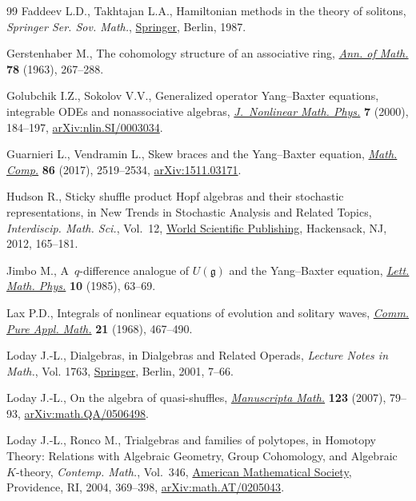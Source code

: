 \documentclass[pdftex]{sigma}
\numberwithin{equation}{section}
\newcounter{diff_order}
\newcounter{diff_power}
\theoremstyle{definition}
\begin{document}
\begin{thebibliography}{99}
Faddeev L.D., Takhtajan L.A., Hamiltonian methods in the theory of solitons,
 \textit{Springer Ser. Sov. Math.},
 \href{https://doi.org/10.1007/978-3-540-69969-9}{Springer}, Berlin, 1987.

Gerstenhaber M., The cohomology structure of an associative ring,
 \href{https://doi.org/10.2307/1970343}{\textit{Ann. of Math.}} \textbf{78}
 (1963), 267--288.

Golubchik I.Z., Sokolov V.V., Generalized operator {Y}ang--{B}axter equations,
 integrable {ODE}s and nonassociative algebras,
 \href{https://doi.org/10.2991/jnmp.2000.7.2.8}{\textit{J.~Nonlinear Math.
 Phys.}} \textbf{7} (2000), 184--197,
 \href{http://arxiv.org/abs/nlin.SI/0003034}{arXiv:nlin.SI/0003034}.

Guarnieri L., Vendramin L., Skew braces and the {Y}ang--{B}axter equation,
 \href{https://doi.org/10.1090/mcom/3161}{\textit{Math. Comp.}} \textbf{86}
 (2017), 2519--2534, \href{http://arxiv.org/abs/1511.03171}{arXiv:1511.03171}.

Hudson R., Sticky shuffle product {H}opf algebras and their stochastic
 representations, in New Trends in Stochastic Analysis and Related Topics,
 \textit{Interdiscip. Math. Sci.}, Vol.~12,
 \href{https://doi.org/10.1142/9789814360920_0006}{World Scientific
 Publishing}, Hackensack, NJ, 2012, 165--181.

Jimbo M., A~{$q$}-difference analogue of {$U({\mathfrak g})$} and the
 {Y}ang--{B}axter equation,
 \href{https://doi.org/10.1007/BF00704588}{\textit{Lett. Math. Phys.}}
 \textbf{10} (1985), 63--69.

Lax P.D., Integrals of nonlinear equations of evolution and solitary waves,
 \href{https://doi.org/10.1002/cpa.3160210503}{\textit{Comm. Pure Appl.
 Math.}} \textbf{21} (1968), 467--490.

Loday J.-L., Dialgebras, in Dialgebras and Related Operads, \textit{Lecture
 Notes in Math.}, Vol. 1763,
 \href{https://doi.org/10.1007/3-540-45328-8_2}{Springer}, Berlin, 2001,
 7--66.

Loday J.-L., On the algebra of quasi-shuffles,
 \href{https://doi.org/10.1007/s00229-007-0086-2}{\textit{Manuscripta Math.}}
 \textbf{123} (2007), 79--93,
 \href{http://arxiv.org/abs/math.QA/0506498}{arXiv:math.QA/0506498}.

Loday J.-L., Ronco M., Trialgebras and families of polytopes, in Homotopy
 Theory: Relations with Algebraic Geo\-metry, Group Cohomology, and Algebraic
 {$K$}-theory, \textit{Contemp. Math.}, Vol.~346,
 \href{https://doi.org/10.1090/conm/346/06296}{American Mathematical Society},
 Providence, RI, 2004, 369--398,
 \href{http://arxiv.org/abs/math.AT/0205043}{arXiv:math.AT/0205043}.


\end{thebibliography}
\end{document}
